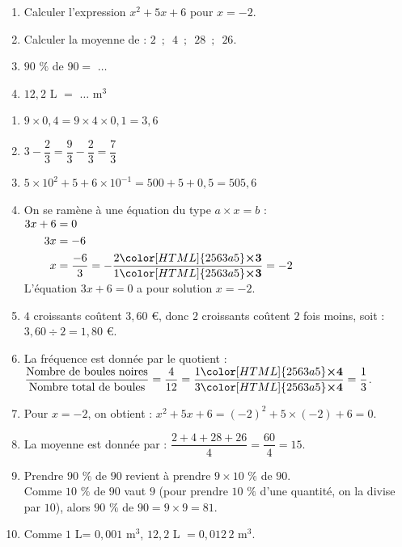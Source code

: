 \documentclass[a4paper,11pt,eval]{nsi} %
\begin{document}
\begin{enumerate}[itemsep=1em]
\\
	\item Calculer l'expression  $x^2+5x+6$ pour $x=-2$.
	\item Calculer la moyenne de :
            $2\,\,\,; \,\,\,4\,\,\,; \,\,\,28\,\,\,; \,\,\,26$.
	\item $90$ $\%$ de $90= $ $\ldots$
	\item  $12{,}2$ L $=$ $\ldots$ m$^3$
\end{enumerate}

\newpage

\textcolor{UGLiBlue}{
\begin{enumerate}[itemsep=1em]
    \item $9 \times 0{,}4=9\times 4\times 0,1=3{,}6$
    \item $3-\dfrac{2}{3}= \dfrac{9}{3}-\dfrac{2}{3}=\dfrac{7}{3}$
    \item $5\times10^2+5+6\times 10^{-1}=500+5+0{,}5=505{,}6$
    \item On se ramène à une équation du type $a\times x=b$ :\\
              $\begin{aligned}
              3x+6&=0\\
             3x&=-6\\
                                  x&=\dfrac{-6}{3}=-\dfrac{2{\color[HTML]{2563a5}\boldsymbol{\times3}} }{1{\color[HTML]{2563a5}\boldsymbol{\times3}}}=-2
             \end{aligned}$\\
              L'équation $3x+6=0$ a pour solution $x=-2$.
    \item $4$ croissants coûtent  $3{,}60$ €, donc
                           $2$ croissants coûtent $2$ fois moins, soit : \\
                           $3{,}60\div 2=1{,}80$ €.
    \item La fréquence est donnée par le quotient : $\dfrac{\text{Nombre de boules noires}}{\text{Nombre total de boules}}=\dfrac{4}{12}=\dfrac{1{\color[HTML]{2563a5}\boldsymbol{\times4}} }{3{\color[HTML]{2563a5}\boldsymbol{\times4}}}=\dfrac{1}{3}$.
    \item 
                Pour $x=-2$, on obtient : $x^2+5x+6=(-2)^2+5\times (-2)+6=0$.  
    \item La moyenne est donnée par : $\dfrac{2+4+28+26}{4}=\dfrac{60}{4}=15$.
    \item           Prendre $90$ $\%$  de $90$ revient à prendre $9\times 10$ $\%$  de $90$.\\
                Comme $10$ $\%$  de $90$ vaut $9$ (pour prendre $10$ $\%$  d'une quantité, on la divise par $10$), alors
                $90$ $\%$ de $90=9\times 9=81$.       
    \item Comme $1$ L= $0,001$ m$^3$, $12{,}2$ L $=0{,}012\,2$  m$^3$.
\end{enumerate}
}
\end{document}
